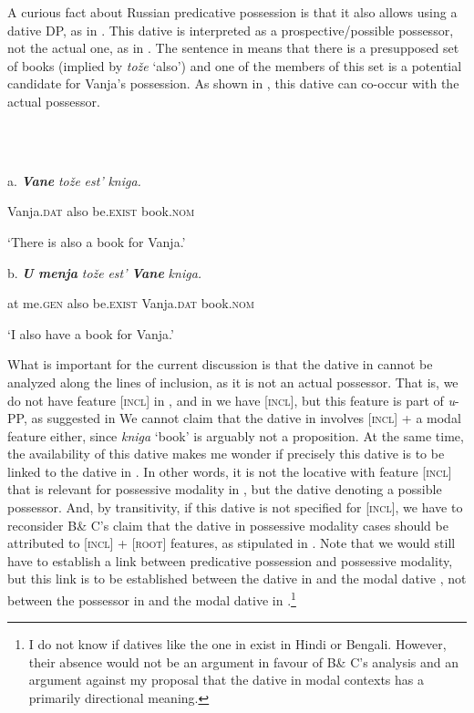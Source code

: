 \documentclass[output=paper,modfonts,nonflat]{langsci/langscibook}
\begin{document}
A curious fact about Russian predicative possession is that it also allows using a dative DP, as in . This dative is interpreted as a prospective/possible possessor, not the actual one, as in . The sentence in  means that there is a presupposed set of books (implied by \textit{tože} ‘also’) and one of the members of this set is a potential candidate for Vanja’s possession. As shown in , this dative can co-occur with the actual possessor. 

\ea%
    \label{ex:key:13}
    \gll\\
        \\
    \glt
    \z

          a.  \textbf{\textit{Vane}}         \textit{tože}    \textit{est’}           \textit{kniga.}

    Vanja.\textsc{dat}   also   be.\textsc{exist}   book.\textsc{nom}

    ‘There is also a book for Vanja.’

  b.  \textbf{\textit{U} \textit{menja}}     \textit{tože}   \textit{est’}           \textbf{\textit{Vane}}         \textit{kniga.}

    at me.\textsc{gen}    also   be.\textsc{exist}   Vanja.\textsc{dat}   book.\textsc{nom}

    ‘I also have a book for Vanja.’       

What is important for the current discussion is that the dative in  cannot be analyzed along the lines of inclusion, as it is not an actual possessor. That is, we do not have feature [\textsc{incl}] in , and in  we have [\textsc{incl}], but this feature is part of \textit{u}{}-PP, as suggested in  We cannot claim that the dative in  involves [\textsc{incl}] + a modal feature either, since \textit{kniga} ‘book’ is arguably not a proposition. At the same time, the availability of this dative makes me wonder if precisely this dative is to be linked to the dative in . In other words, it is not the locative with feature [\textsc{incl}] that is relevant for possessive modality in , but the dative denoting a possible possessor. And, by transitivity, if this dative is not specified for [\textsc{incl}], we have to reconsider B\& C’s claim that the dative in possessive modality cases should be attributed to [\textsc{incl}] + [\textsc{root}] features, as stipulated in . Note that we would still have to establish a link between predicative possession and possessive modality, but this link is to be established between the dative in  and the modal dative , not between the possessor in  and the modal dative in .\footnote{I do not know if datives like the one in  exist in Hindi or Bengali. However, their absence would not be an argument in favour of B\& C’s analysis and an argument against my proposal that the dative in modal contexts has a primarily directional meaning.}   
\end{document}
